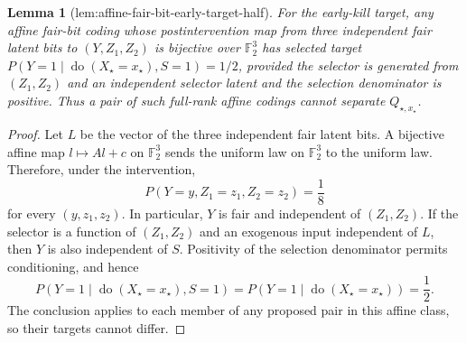 \documentclass{article}
\newtheorem{lemma}{Lemma}
\begin{document}
\begin{lemma}[lem:affine-fair-bit-early-target-half]\label{lem:affine-fair-bit-early-target-half}
For the early-kill target, any affine fair-bit coding whose postintervention map from three independent fair latent bits to \((Y,Z_1,Z_2)\) is bijective over \(\mathbb F_2^3\) has selected target \(P(Y=1\mid\operatorname{do}(X_\star=x_\star),S=1)=1/2\), provided the selector is generated from \((Z_1,Z_2)\) and an independent selector latent and the selection denominator is positive. Thus a pair of such full-rank affine codings cannot separate \(Q_{\star,x_\star}\).
\end{lemma}
\begin{proof}
Let \(L\) be the vector of the three independent fair latent bits. A bijective affine map \(l\mapsto Al+c\) on \(\mathbb F_2^3\) sends the uniform law on \(\mathbb F_2^3\) to the uniform law. Therefore, under the intervention,
\[
 P(Y=y,Z_1=z_1,Z_2=z_2)=\frac18
\]
for every \((y,z_1,z_2)\). In particular, \(Y\) is fair and independent of \((Z_1,Z_2)\). If the selector is a function of \((Z_1,Z_2)\) and an exogenous input independent of \(L\), then \(Y\) is also independent of \(S\). Positivity of the selection denominator permits conditioning, and hence
\[
 P(Y=1\mid\operatorname{do}(X_\star=x_\star),S=1)
 =P(Y=1\mid\operatorname{do}(X_\star=x_\star))=\frac12.
\]
The conclusion applies to each member of any proposed pair in this affine class, so their targets cannot differ.
\end{proof}
\end{document}
